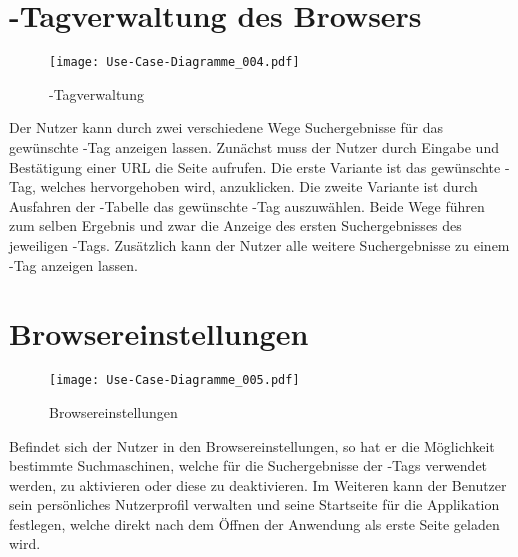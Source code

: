\section{\SEARCH-Tagverwaltung des Browsers}
\begin{figure}[htb]
\texttt{[image: Use-Case-Diagramme\_004.pdf]}
	\caption{\SEARCH-Tagverwaltung}
	\label{fig:SEARCH-Tagverwaltung}
\end{figure}
Der Nutzer kann durch zwei verschiedene Wege Suchergebnisse für das gewünschte \SEARCH-Tag anzeigen lassen. Zunächst muss der Nutzer durch Eingabe und Bestätigung einer URL die Seite aufrufen. Die erste Variante ist das gewünschte \SEARCH-Tag, welches hervorgehoben wird, anzuklicken. Die zweite Variante ist durch Ausfahren der \SEARCH-Tabelle das gewünschte \SEARCH-Tag auszuwählen. Beide Wege führen zum selben Ergebnis und zwar die Anzeige des ersten Suchergebnisses des jeweiligen \SEARCH-Tags. Zusätzlich kann der Nutzer alle weitere Suchergebnisse zu einem \SEARCH-Tag anzeigen lassen.

\section{Browsereinstellungen}
\begin{figure}[htb]
\texttt{[image: Use-Case-Diagramme\_005.pdf]}
	\caption{Browsereinstellungen}
	\label{fig:Browsereinstellungen}
\end{figure}
Befindet sich der Nutzer in den Browsereinstellungen, so hat er die Möglichkeit bestimmte Suchmaschinen, welche für die Suchergebnisse der \SEARCH-Tags verwendet werden, zu aktivieren oder diese zu deaktivieren. Im Weiteren kann der Benutzer sein persönliches Nutzerprofil verwalten und seine Startseite für die Applikation festlegen, welche direkt nach dem Öffnen der Anwendung als erste Seite geladen wird.
